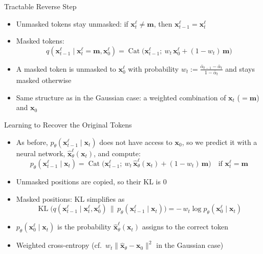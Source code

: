\documentclass[11pt,compress,t,notes=noshow, xcolor=table]{beamer}
\providecommand{\bx}{\mathbf{x}}
\begin{document}
\begin{frame}{Tractable Reverse Step}
 
\vfill
 
\begin{itemize}
\item Unmasked tokens stay unmasked: if $\bx_t^\ell \neq \mathbf{m}$, then $\bx_{t-1}^\ell = \bx_t^\ell$
\item Masked tokens:
\begin{equation*}
q(\bx_{t-1}^\ell \mid \bx_t^\ell = \mathbf{m}, \bx_0^\ell) = \operatorname{Cat}\Big(\bx_{t-1}^\ell;\ w_t\, \bx_0^\ell + (1 - w_t)\, \mathbf{m}\Big)
\end{equation*}
\item A masked token is unmasked to $\bx_0^\ell$ with probability $w_t := \frac{\bar{\alpha}_{t-1} - \bar{\alpha}_t}{1 - \bar{\alpha}_t}$ and stays masked otherwise
\item Same structure as in the Gaussian case: a weighted combination of $\bx_t$ ($= \mathbf{m}$) and $\bx_0$
\end{itemize}
 
\vfill
 
\end{frame}



\begin{frame}{Learning to Recover the Original Tokens}
 
\vfill
 
\begin{itemize}
\item As before, $p_\theta(\bx_{t-1}^\ell \mid \bx_t)$ does not have access to $\bx_0$, so we predict it with a neural network, $\hat{\bx}_\theta^\ell(\bx_t)$, and compute:
\begin{equation*}
p_\theta(\bx_{t-1}^\ell \mid \bx_t) = \operatorname{Cat}\big(\bx_{t-1}^\ell;\ w_t\, \hat{\bx}_\theta^\ell(\bx_t) + (1 - w_t)\, \mathbf{m}\big) \quad \text{if } \bx_t^\ell = \mathbf{m}
\end{equation*}
\item Unmasked positions are copied, so their KL is $0$
\item Masked positions: KL simplifies as
\begin{equation*}
\operatorname{KL}\big(q(\bx_{t-1}^\ell \mid \bx_t^\ell, \bx_0^\ell) \,\|\, p_\theta(\bx_{t-1}^\ell \mid \bx_t)\big) = -\,w_t \log p_\theta(\bx_0^\ell \mid \bx_t)
\end{equation*}
\item $p_\theta(\bx_0^\ell \mid \bx_t)$ is the probability $\hat{\bx}_\theta^\ell(\bx_t)$ assigns to the correct token
\item Weighted cross-entropy (cf.\ $w_t \|\hat{\bx}_\theta - \bx_0\|^2$ in the Gaussian case)
\end{itemize}
 
\vfill
 
\end{frame}
\end{document}

